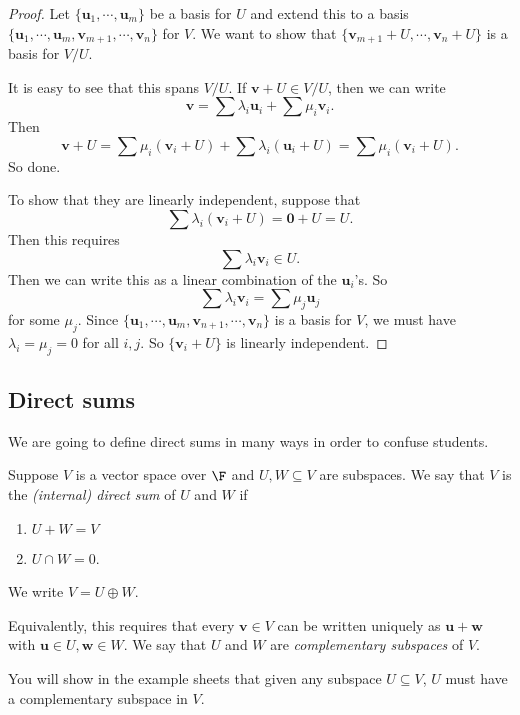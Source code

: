 \documentclass[a4paper]{article}
\begin{document}
\begin{proof}
  Let $\{\mathbf{u}_1, \cdots, \mathbf{u}_m\}$ be a basis for $U$ and extend this to a basis $\{\mathbf{u}_1, \cdots, \mathbf{u}_m,\allowbreak \mathbf{v}_{m + 1}, \cdots, \mathbf{v}_n\}$ for $V$. We want to show that $\{\mathbf{v}_{m + 1} + U, \cdots, \mathbf{v}_n + U\}$ is a basis for $V/U$.

  It is easy to see that this spans $V/U$. If $\mathbf{v} + U \in V/U$, then we can write
  \[
    \mathbf{v} = \sum \lambda_i \mathbf{u}_i + \sum \mu_i \mathbf{v}_i.
  \]
  Then
  \[
    \mathbf{v} + U = \sum \mu_i (\mathbf{v}_i + U) + \sum \lambda_i (\mathbf{u}_i + U) = \sum \mu_i (\mathbf{v}_i + U).
  \]
  So done.

  To show that they are linearly independent, suppose that
  \[
    \sum \lambda_i (\mathbf{v}_i + U) = \mathbf{0} + U = U.
  \]
  Then this requires
  \[
    \sum \lambda_i \mathbf{v}_i \in U.
  \]
  Then we can write this as a linear combination of the $\mathbf{u}_i$'s. So
  \[
    \sum \lambda_i \mathbf{v}_i = \sum \mu_j \mathbf{u}_j
  \]
  for some $\mu_j$. Since $\{\mathbf{u}_1, \cdots, \mathbf{u}_m, \mathbf{v}_{n + 1}, \cdots, \mathbf{v}_n\}$ is a basis for $V$, we must have $\lambda_i = \mu_j = 0$ for all $i, j$. So $\{\mathbf{v}_i + U\}$ is linearly independent.
\end{proof}
\subsection{Direct sums}
We are going to define direct sums in many ways in order to confuse students.
\begin{defi}
  Suppose $V$ is a vector space over $\F$ and $U, W\subseteq V$ are subspaces. We say that $V$ is the \emph{(internal) direct sum} of $U$ and $W$ if
  \begin{enumerate}
    \item $U + W = V$
    \item $U \cap W = 0$.
  \end{enumerate}
  We write $V = U\oplus W$.

  Equivalently, this requires that every $\mathbf{v}\in V$ can be written uniquely as $\mathbf{u} + \mathbf{w}$ with $\mathbf{u}\in U, \mathbf{w}\in W$. We say that $U$ and $W$ are \emph{complementary subspaces} of $V$.
\end{defi}
You will show in the example sheets that given any subspace $U \subseteq V$, $U$ must have a complementary subspace in $V$.
\end{document}
